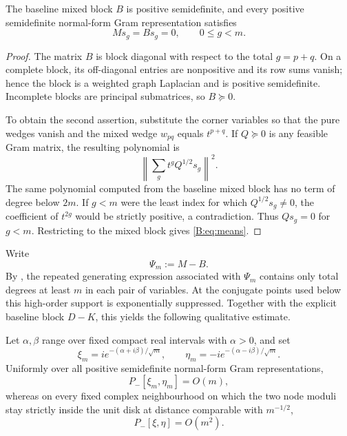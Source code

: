 \begin{lemma}\label{B:lem:means}
The baseline mixed block $B$ is positive semidefinite, and every
positive semidefinite normal-form Gram representation satisfies
\begin{equation}\label{B:eq:means}
                 Ms_g=Bs_g=0,\qquad 0\le g<m.
\end{equation}
\end{lemma}

\begin{proof}
The matrix $B$ is block diagonal with respect to the total
$g=p+q$.  On a complete block, its off-diagonal entries are
nonpositive and its row sums vanish; hence the block is a weighted
graph Laplacian and is positive semidefinite.  Incomplete blocks are
principal submatrices, so $B\succeq0$.

To obtain the second assertion, substitute the corner variables so that
the pure wedges vanish and the mixed wedge $w_{pq}$ equals $t^{p+q}$.
If $Q\succeq0$ is any feasible Gram matrix, the resulting polynomial
is
\[
 \left\|\sum_g t^gQ^{1/2}s_g\right\|^2.
\]
The same polynomial computed from the baseline mixed block has no term
of degree below $2m$.  If $g<m$ were the least index for which
$Q^{1/2}s_g\ne0$, the coefficient of $t^{2g}$ would be strictly
positive, a contradiction.  Thus $Qs_g=0$ for $g<m$.  Restricting to
the mixed block gives \eqref{B:eq:means}.
\end{proof}

Write
\[
        \Psi_m:=M-B.
\]
By , the repeated generating expression associated
with $\Psi_m$ contains only total degrees at least $m$ in each pair of
variables.  At the conjugate points used below this high-order support
is exponentially suppressed.  Together with the explicit baseline
block $D-K$, this yields the following qualitative estimate.

\begin{lemma}\label{B:lem:conjugate}
Let $\alpha,\beta$ range over fixed compact real intervals with
$\alpha>0$, and set
\[
 \xi_m=ie^{-(\alpha+i\beta)/\sqrt m},\qquad
 \eta_m=-ie^{-(\alpha-i\beta)/\sqrt m}.
\]
Uniformly over all positive semidefinite normal-form Gram
representations,
\[
        P_-[\xi_m,\eta_m]=O(m),
\]
whereas on every fixed complex neighbourhood on which the two node
moduli stay strictly inside the unit disk at distance comparable with
$m^{-1/2}$,
\[
        P_-[\xi,\eta]=O(m^2).
\]
\end{lemma}


